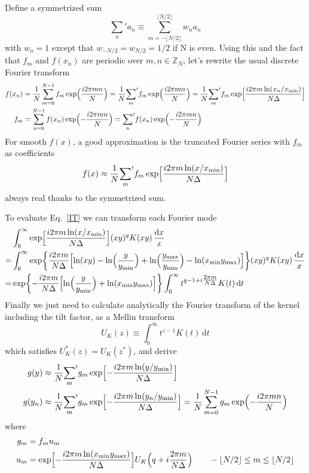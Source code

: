 \documentclass{article}
\renewcommand{\d}{\mathrm{d}}
\newcommand{\xmin}{x_\textrm{min}}
\newcommand{\ymin}{y_\textrm{min}}
\newcommand{\ymax}{y_\textrm{max}}
\newcommand{\Nhalf}{\lfloor N/2\rfloor}
\begin{document}
Define a symmetrized sum
\begin{equation}
    {\sum_n}' a_n \equiv \sum_{m=-\Nhalf}^{\Nhalf} w_n a_n
\end{equation}
with $w_n=1$ except that $w_{-N/2}=w_{N/2}=1/2$ if N is even.
Using this and the fact that $f_m$ and $f(x_n)$ are periodic over $m,n\in\mathbb{Z}_N$,
let's rewrite the usual discrete Fourier transform
\begin{align}
    f(x_n) &= \frac1N \sum_{m=0}^{N-1} f_m \exp\Bigl(\frac{i2\pi mn}N\Bigr)
    = \frac1N {\sum_m}' f_m \exp\Bigl(\frac{i2\pi mn}N\Bigr)
    = \frac1N {\sum_m}' f_m \exp\Bigl[\frac{i2\pi m\ln(x_n/\xmin)}{N\Delta}\Bigr]  \\
    \label{step1}
    f_m &= \sum_{n=0}^{N-1} f(x_n) \exp\Bigl(-\frac{i2\pi mn}N\Bigr)
    = {\sum_n}' f(x_n) \exp\Bigl(-\frac{i2\pi mn}N\Bigr)
\end{align}
For smooth $f(x)$, a good approximation is the truncated Fourier series
with $f_m$ as coefficients
\begin{equation}
    f(x) \approx \frac1N {\sum_m}' f_m \exp\Bigl[\frac{i2\pi m\ln(x/\xmin)}{N\Delta}\Bigr]
\end{equation}
always real thanks to the symmetrized sum.

To evaluate Eq.~\eqref{IT} we can transform each Fourier mode
\begin{align}
    &\int_0^\infty \exp\Bigl[\frac{i2\pi m\ln(x/\xmin)}{N\Delta}\Bigr]
        (xy)^q K(xy) \,\frac{\d x}x  \\
    = &\int_0^\infty \exp\biggl\{\frac{i2\pi m}{N\Delta}
        \Bigl[\ln(xy)-\ln\Bigl(\frac{y}{\ymin}\Bigr)
            +\ln\Bigl(\frac{\ymax}{\ymin}\Bigr)-\ln(\xmin\ymax)\Bigr]
    \biggr\} (xy)^q K(xy) \,\frac{\d x}x  \\
    = &\exp\biggl\{-\frac{i2\pi m}{N\Delta}
        \Bigl[\ln\Bigl(\frac{y}{\ymin}\Bigr)+\ln(\xmin\ymax)\Bigr]
    \biggr\} \int_0^\infty t^{q-1+i\tfrac{2\pi m}{N\Delta}} K(t) \,\d t
\end{align}
Finally we just need to calculate analytically
the Fourier transform of the kernel including the tilt factor,
as a Mellin transform
\begin{equation}
    \label{Mellin}
    U_K(z) \equiv \int_0^\infty t^{z-1} K(t) \,\d t
\end{equation}
which satisfies $U_K^*(z)=U_K(z^*)$, and derive
\begin{align}
    g(y) &\approx \frac1N {\sum_m}' g_m \exp\Bigl[-\frac{i2\pi m\ln(y/\ymin)}{N\Delta}\Bigr]  \\
    \label{step6}
    g(y_n) &\approx \frac1N {\sum_m}' g_m \exp\Bigl[-\frac{i2\pi m\ln(y_n/\ymin)}{N\Delta}\Bigr]
    = \frac1N \sum_{m=0}^{N-1} g_m \exp\Bigl(-\frac{i2\pi mn}N\Bigr)
\end{align}
where
\begin{align}
    \label{step5}
    g_m &= f_m u_m  \\
    \label{step4}
    u_m &= \exp\Bigl[-\frac{i2\pi m\ln(\xmin\ymax)}{N\Delta}\Bigr]
    U_K\Bigl(q+i\frac{2\pi m}{N\Delta}\Bigr) \qquad -\Nhalf\leq m\leq\Nhalf
\end{align}
\end{document}
